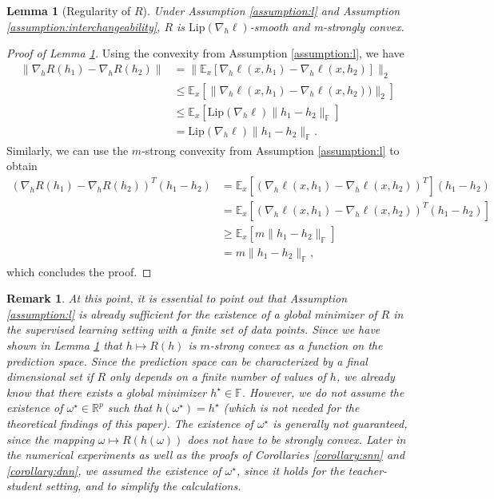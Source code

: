 \documentclass[10pt]{article} %
\newcommand{\bE}{\mathbb{E}}
\newcommand{\bF}{\mathbb{F}}
\newcommand{\bR}{\mathbb{R}}
\newtheorem{remark}{Remark}
\newtheorem{lemma}{Lemma}
\begin{document}
\begin{lemma}[Regularity of $R$]\label{lemma:Rproperties}
    Under Assumption \ref{assumption:l} and Assumption \ref{assumption:interchangeability}, $R$ is $\mathrm{Lip}(\nabla_h \ell)$-smooth and m-strongly convex.
\end{lemma}
\begin{proof}[Proof of Lemma \ref{lemma:Rproperties}]
    Using the convexity from Assumption \ref{assumption:l}, we have
    \begin{align*}
        \|\nabla_h R(h_1)-\nabla_h R(h_2)\|&=\|\bE_x[\nabla_h\ell(x,h_1)-\nabla_h\ell(x,h_2)]\|_2\\
        &\leq\bE_x[\|\nabla_h\ell(x,h_1)-\nabla_h\ell(x,h_2))\|_2]\\
        &\leq \bE_x[\mathrm{Lip}(\nabla_h \ell)\|h_1-h_2\|_\bF]\\
        &=\mathrm{Lip}(\nabla_h \ell)\|h_1-h_2\|_\bF.
    \end{align*}
    Similarly, we can use the $m$-strong convexity from Assumption \ref{assumption:l} to obtain
    \begin{align*}
        (\nabla_h R(h_1)-\nabla_h R(h_2))^T(h_1-h_2)&=\bE_x[(\nabla_h\ell(x,h_1)-\nabla_h\ell(x,h_2))^T](h_1-h_2)\\
        &=\bE_x[(\nabla_h\ell(x,h_1)-\nabla_h\ell(x,h_2))^T(h_1-h_2)]\\
        &\geq \bE_x[m\|h_1-h_2\|_\bF]\\
        &= m\|h_1-h_2\|_\bF,
    \end{align*}
    which concludes the proof.
\end{proof}
\begin{remark}\label{remark:globalmin}
    At this point, it is essential to point out that Assumption \ref{assumption:l} is already sufficient for the existence of a global minimizer of $R$ in the supervised learning setting with a finite set of data points. Since we have shown in Lemma \ref{lemma:Rproperties} that $h\mapsto R(h)$ is $m$-strong convex as a function on the prediction space. Since the prediction space can be characterized by a final dimensional set if $R$ only depends on a finite number of values of $h$, we already know that there exists a global minimizer $h^\star\in\bF$. However, we do not assume the existence of $\omega^\star\in\bR^p$ such that $h(\omega^\star)=h^\star$ (which is not needed for the theoretical findings of this paper). The existence of $\omega^\star$ is generally not guaranteed, since the mapping $\omega\mapsto R(h(\omega))$ does not have to be strongly convex. Later in the numerical experiments as well as the proofs of Corollaries \ref{corollary:snn} and \ref{corollary:dnn}, we assumed the existence of $\omega^\star$, since it holds for the teacher-student setting, and to simplify the calculations.
\end{remark}
\end{document}
